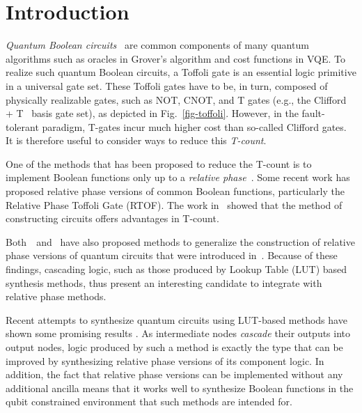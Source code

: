 \documentclass[paper]{ieice}
\providecommand{\DIFadd}[1]{{\protect\color{blue}{#1}}} %
\providecommand{\DIFaddbegin}{} %
\providecommand{\DIFaddend}{} %
\newcommand{\DIFaddincludegraphics}[2][]{{\color{blue}\fbox{\DIFOincludegraphics[#1]{#2}}}} %
\DeclareRobustCommand{\DIFaddbegin}{\DIFOaddbegin \let\includegraphics\DIFaddincludegraphics} %
\DeclareRobustCommand{\DIFaddend}{\DIFOaddend \let\includegraphics\DIFOincludegraphics} %
\begin{document}
\section{Introduction}

{\it Quantum Boolean circuits}~\cite{bib-ddmf} are common components of many quantum algorithms such as oracles in Grover's algorithm and cost functions in VQE. To realize such quantum Boolean circuits, a Toffoli gate is an essential logic primitive in a universal gate set. These Toffoli gates have to be, in turn, composed of physically realizable gates, such as NOT, CNOT, and T gates (e.g., the Clifford + T~\cite{bib-barenco-elementary} basis gate set), as depicted in Fig.~\ref{fig-toffoli}. However, in the fault-tolerant paradigm, T-gates incur much higher cost than so-called Clifford gates. It is therefore useful to consider ways to reduce this {\it T-count}\DIFaddbegin \DIFadd{, which is the number of both the T-gates and their inverse in the circuit}\DIFaddend .

One of the methods that has been proposed to reduce the T-count is to implement Boolean functions only up to a {\it relative phase}~\cite{bib-barenco-elementary}\DIFaddbegin \DIFadd{, which is an input dependent phase on the output}\DIFaddend . Some recent work \cite{bib-rtof-maslov,bib-selinger-rtof,bib-amy-phase-state} has proposed relative phase versions of common Boolean functions, particularly the Relative Phase Toffoli Gate (RTOF). 
The work in~\cite{bib-rtof-maslov} showed that the method of constructing circuits \DIFaddbegin \DIFadd{in this relative phase manner }\DIFaddend offers advantages in T-count.

Both~\cite{bib-rtof-maslov}~and~\cite{bib-amy-phase-state} have also proposed methods to generalize the 
construction of relative phase versions of quantum circuits that were introduced in~\cite{bib-selinger-rtof}. 
\DIFaddbegin \DIFadd{These identify matching pairs of compute/uncompute logic as a possible application of relative phase 
circuits, because any relative phase introduced can be canceled out by simply using the inverse of the
gate in the uncompute logic. }\DIFaddend Because of these findings, cascading logic, such as those 
produced by Lookup Table (LUT) based synthesis methods, thus present an interesting candidate to integrate 
with relative phase methods.

Recent attempts to synthesize quantum circuits using LUT-based methods have shown some promising results \cite{bib-lhrs-soeken}. As intermediate nodes {\it cascade} their outputs into output nodes, logic produced by such a method is exactly the type that can be improved by synthesizing relative phase versions of its component logic. In addition, the fact that relative phase versions can be implemented without any additional ancilla means that it works well to synthesize Boolean functions in the qubit constrained environment that such methods are intended for. 
\end{document}
